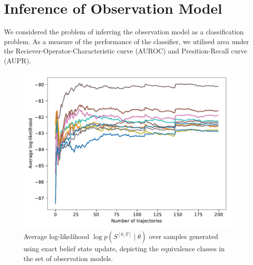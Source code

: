 \section{Inference of Observation Model}
We considered the problem of inferring the observation model as a classification problem. As a measure of the performance of the classifier, we utilised area under the Reciever-Operator-Characteristic curve (AUROC) and Presition-Recall curve (AUPR). 
\begin{figure}[t]
	\begin{center}
		\includegraphics[width=.7\textwidth]{figures/equivalence_classes/llh_exactUpdate_81model}
		\caption[Equivalence classes in the case of exact belief update]{Average log-likelihood $ \log p(S^{[0,T]} \mid \theta) $ over samples generated using exact belief state update, depicting the equivalence classes in the set of observation models.}
		\label{fig:llh_exactUpdate_81model}
	\end{center}
\end{figure}
